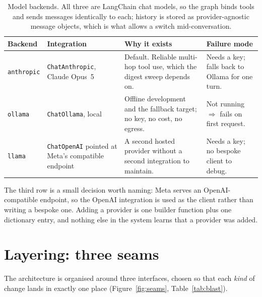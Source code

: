 \documentclass[11pt,a4paper]{article}
\newcommand{\tablefont}{\footnotesize}
\begin{document}
\begin{table}[!ht]
\centering\tablefont
\caption{Model backends. All three are LangChain chat models, so the graph binds tools and
sends messages identically to each; history is stored as provider-agnostic message objects,
which is what allows a switch mid-conversation.}
\label{tab:backends}
\begin{tabularx}{\textwidth}{L{1.9cm} L{3.5cm} X L{3.3cm}}
\toprule
\textbf{Backend} & \textbf{Integration} & \textbf{Why it exists} & \textbf{Failure mode} \\
\midrule
\texttt{anthropic} & \texttt{ChatAnthropic}, Claude Opus~5 & Default. Reliable multi-hop
  tool use, which the digest sweep depends on. & Needs a key; falls back to Ollama for
  one turn. \\
\texttt{ollama} & \texttt{ChatOllama}, local & Offline development and the fallback target;
  no key, no cost, no egress. & Not running $\Rightarrow$ fails on first request. \\
\texttt{llama} & \texttt{ChatOpenAI} pointed at Meta's compatible endpoint & A second hosted
  provider without a second integration to maintain. & Needs a key; no bespoke client to
  debug. \\
\bottomrule
\end{tabularx}
\end{table}

The third row is a small decision worth naming: Meta serves an OpenAI-compatible endpoint,
so the OpenAI integration is used as the client rather than writing a bespoke one. Adding a
provider is one builder function plus one dictionary entry, and nothing else in the system
learns that a provider was added.

\section{Layering: three seams}

The architecture is organised around three interfaces, chosen so that each \emph{kind} of
change lands in exactly one place (Figure~\ref{fig:seams}, Table~\ref{tab:blast}).
\end{document}
